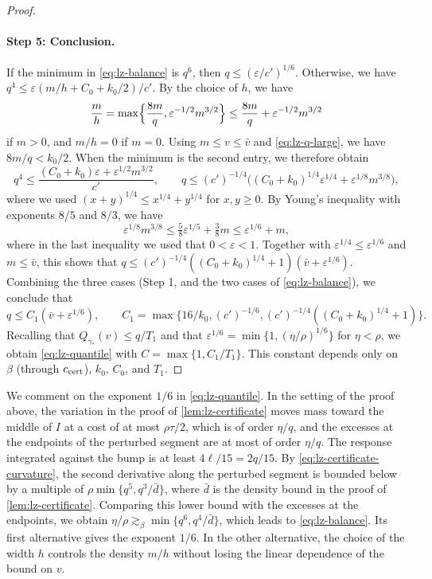 \begin{proof}
\paragraph{Step 5: Conclusion.}
If the minimum in \eqref{eq:lz-balance} is $q^6$, then
$q\le(\varepsilon/c')^{1/6}$. Otherwise, we have
$q^4\le\varepsilon(m/h+C_0+k_0/2)/c'$. By the choice of $h$, we have
\[
 \frac mh=\max\Bigl\{\frac{8m}q,\varepsilon^{-1/2}m^{3/2}\Bigr\}
 \le\frac{8m}q+\varepsilon^{-1/2}m^{3/2}
\]
if $m>0$, and $m/h=0$ if $m=0$. Using $m\le v\le\bar v$
and \eqref{eq:lz-q-large}, we have $8m/q<k_0/2$. When the minimum is the second entry, we therefore
obtain
\[
 q^4\le\frac{(C_0+k_0)\varepsilon+\varepsilon^{1/2}m^{3/2}}{c'},
 \qquad
 q\le(c')^{-1/4}\bigl((C_0+k_0)^{1/4}\varepsilon^{1/4}
                           +\varepsilon^{1/8}m^{3/8}\bigr),
\]
where we used $(x+y)^{1/4}\le x^{1/4}+y^{1/4}$ for $x,y\ge0$. By Young's
inequality with exponents $8/5$ and $8/3$, we have
\[
 \varepsilon^{1/8}m^{3/8}
 \le\tfrac58\varepsilon^{1/5}+\tfrac38m
 \le\varepsilon^{1/6}+m,
\]
where in the last inequality we used that $0<\varepsilon<1$. Together with
$\varepsilon^{1/4}\le\varepsilon^{1/6}$ and $m\le\bar v$, this shows that
$q\le(c')^{-1/4}((C_0+k_0)^{1/4}+1)(\bar v+\varepsilon^{1/6})$. Combining the
three cases (Step 1, and the two cases of \eqref{eq:lz-balance}), we conclude
that
\[
 q\le C_1(\bar v+\varepsilon^{1/6}),\qquad
 C_1=\max\bigl\{16/k_0,(c')^{-1/6},(c')^{-1/4}((C_0+k_0)^{1/4}+1)\bigr\}.
\]
Recalling that $Q_{\gamma_*}(v)\le q/T_1$ and that
$\varepsilon^{1/6}=\min\{1,(\eta/\rho)^{1/6}\}$ for $\eta<\rho$, we obtain
\eqref{eq:lz-quantile} with $C=\max\{1,C_1/T_1\}$. This constant depends only
on $\beta$ (through $c_{\rm cert}$), $k_0$, $C_0$, and $T_1$.
\end{proof}

We comment on the exponent $1/6$ in \eqref{eq:lz-quantile}. In the setting of
the proof above, the variation in the proof of \cref{lem:lz-certificate}
moves mass toward the middle of $I$ at a cost of at most $\rho\tau/2$, which
is of order $\eta/q$, and the excesses at the endpoints of the perturbed
segment are at most of order $\eta/q$. The response integrated against the
bump is at least $4\ell/15=2q/15$. By \eqref{eq:lz-certificate-curvature}, the
second derivative along the perturbed segment is bounded below by a multiple
of $\rho\min\{q^5,q^3/\bar d\}$, where $\bar d$ is the density bound in the
proof of \cref{lem:lz-certificate}. Comparing this lower bound with the excesses at the endpoints, we obtain
$\eta/\rho\gtrsim_\beta\min\{q^6,q^4/\bar d\}$, which leads to
\eqref{eq:lz-balance}. Its first alternative gives the exponent $1/6$. In the
other alternative, the choice of the width $h$ controls the density $m/h$
without losing the linear dependence of the bound on $v$.

